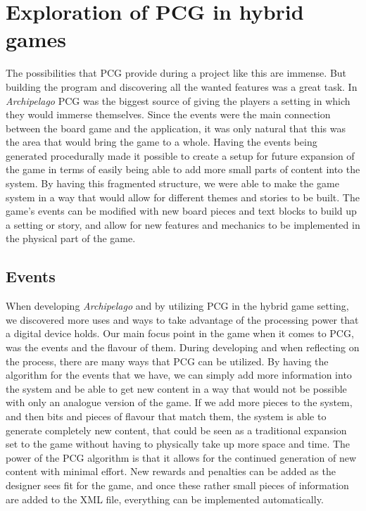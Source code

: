 \section{Exploration of PCG in hybrid games}
The possibilities that PCG provide during a project like this are immense. But building the program and discovering all the wanted features was a great task. In \textit{Archipelago} PCG was the biggest source of giving the players a setting in which they would immerse themselves. Since the events were the main connection between the board game and the application, it was only natural that this was the area that would bring the game to a whole. Having the events being generated procedurally made it possible to create a setup for future expansion of the game in terms of easily being able to add more small parts of content into the system. By having this fragmented structure, we were able to make the game system in a way that would allow for different themes and stories to be built. The game's events can be modified with new board pieces and text blocks to build up a setting or story, and allow for new features and mechanics to be implemented in the physical part of the game.

\subsection{Events}
When developing \textit{Archipelago} and by utilizing PCG in the hybrid game setting, we discovered more uses and ways to take advantage of the processing power that a digital device holds. Our main focus point in the game when it comes to PCG, was the events and the flavour of them. During developing and when reflecting on the process, there are many ways that PCG can be utilized. By having the algorithm for the events that we have, we can simply add more information into the system and be able to get new content in a way that would not be possible with only an analogue version of the game. If we add more pieces to the system, and then bits and pieces of flavour that match them, the system is able to generate completely new content, that could be seen as a traditional expansion set to the game without having to physically take up more space and time. The power of the PCG algorithm is that it allows for the continued generation of new content with minimal effort. New rewards and penalties can be added as the designer sees fit for the game, and once these rather small pieces of information are added to the XML file, everything can be implemented automatically.

